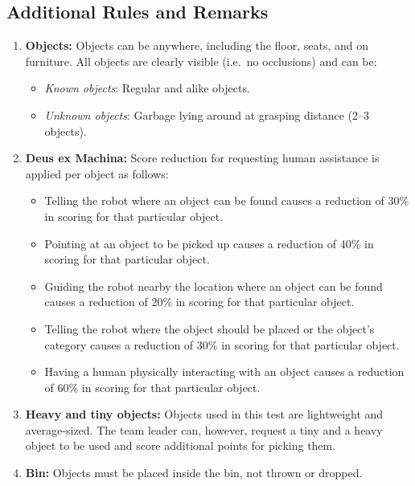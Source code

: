 \subsection*{Additional Rules and Remarks}
\begin{enumerate}[nosep]
	\item \textbf{Objects:}
	Objects can be anywhere, including the floor, seats, and on furniture.
	All objects are clearly visible (i.e.~no occlusions) and can be:
	\begin{itemize}[nosep]
		\item\textit{Known objects}: Regular and alike objects.
		\item\textit{Unknown objects}: Garbage lying around at grasping distance (2--3 objects).
	\end{itemize}

	\item \textbf{Deus ex Machina:} Score reduction for requesting human assistance is applied per object as follows:
	\begin{itemize}[nosep]
		\item Telling the robot where an object can be found causes a reduction of 30\% in scoring for that particular object.

		\item Pointing at an object to be picked up causes a reduction of 40\% in scoring for that particular object.

		\item Guiding the robot nearby the location where an object can be found causes a reduction of 20\% in scoring for that particular object.

		\item Telling the robot where the object should be placed or the object's category causes a reduction of 30\% in scoring for that particular object.

		\item Having a human physically interacting with an object causes a reduction of 60\% in scoring for that particular object.
	\end{itemize}

	\item \textbf{Heavy and tiny objects:} Objects used in this test are lightweight and average-sized.
	The team leader can, however, request a tiny and a heavy object to be used and score additional points for picking them.

	\item \textbf{Bin:} Objects must be placed inside the bin, not thrown or dropped.
\end{enumerate}

